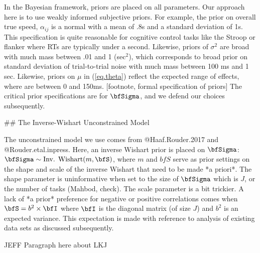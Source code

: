 \documentclass[man, 12pt]{apa7} %
\begin{document}
In the Bayesian framework, priors are placed on all parameters.  Our approach here is to use weakly informed subjective priors.  For example, the prior on overall true speed, $\alpha_{ij}$ is a normal with a mean of .8s and a standard deviation of 1s.  This specification is quite reasonable for cognitive control tasks like the Stroop or flanker where RTs are typically under a second.  Likewise, priors of $\sigma^2$ are broad with much mass between .01 and 1 (sec$^2$), which corresponds to broad prior on standard deviation of trial-to-trial noise with much mass between 100 ms and 1 sec.  Likewise, priors on $\mu$ in (\ref{eq.theta}) reflect the expected range of effects, where are between 0 and 150ms. [footnote, formal specification of priors]  The critical prior specifications are for $\bfSigma$, and we defend our choices subsequently.


## The Inverse-Wishart Unconstrained Model

The unconstrained model we use comes from @Haaf.Rouder.2017 and @Rouder.etal.inpress.  Here, an inverse Wishart prior is placed on $\bfSigma$: $\bfSigma \sim \mbox{Inv. Wishart}(m,\bfS)$, where $m$ and $bfS$ serve as prior settings on the shape and scale of the inverse Wishart that need to be made *a priori*.  The shape parameter is uninformative when set to the size of $\bfSigma$ which is $J$, or the number of tasks (Mahbod, check).  The scale parameter is a bit trickier.  A lack of *a prior* preference for negative or positive correlations comes when $\bfS=b^2\times\bfI$ where $\bfI$ is the diagonal matrix (of size $J$) and $b^2$ is an expected variance.  This expectation is made with reference to analysis of existing data sets as discussed subsequently.

JEFF Paragraph here about LKJ












\printbibliography
\end{document}
